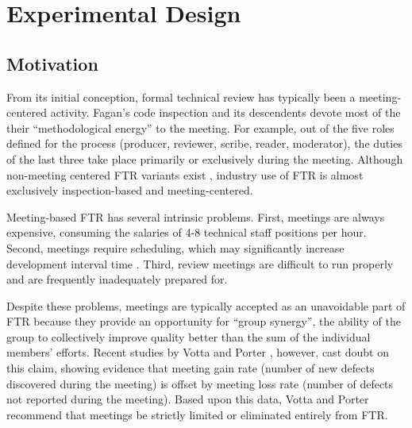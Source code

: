 
\section{Experimental Design}
\subsection{Motivation}
\label{sec:lab-investigations}

From its initial conception, formal technical review has typically been a
meeting-centered activity.  Fagan's code inspection \cite{Fagan76}
and its descendents \cite{Gilb93} devote most of the their ``methodological
energy'' to the meeting. For example, out of the five roles defined for the
process (producer, reviewer, scribe, reader, moderator), the duties of the
last three take place primarily or exclusively during the meeting. Although
non-meeting centered FTR variants exist \cite{Parnas87,Knight93,csdl-93-17},
industry use of FTR is almost exclusively inspection-based and
meeting-centered.

Meeting-based FTR has several intrinsic problems. First, meetings are
always expensive, consuming the salaries of 4-8 technical staff positions
per hour.  Second, meetings require scheduling, which may significantly
increase development interval time \cite{Votta93}.  Third, review
meetings are difficult to run properly and are frequently inadequately
prepared for.

Despite these problems, meetings are typically accepted as an unavoidable
part of FTR because they provide an opportunity for ``group synergy'', the
ability of the group to collectively improve quality better than the sum of
the individual members' efforts.  Recent studies by Votta \cite{Votta93}
and Porter \cite{Porter94}, however, cast doubt on this claim, showing
evidence that meeting gain rate (number of new defects discovered during
the meeting) is offset by meeting loss rate (number of defects not reported
during the meeting).  Based upon this data, Votta and Porter recommend that
meetings be strictly limited or eliminated entirely from FTR.

